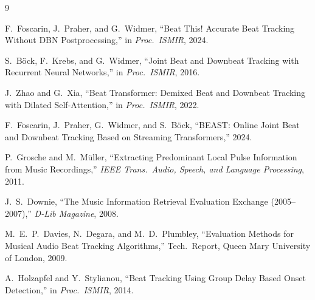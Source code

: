 \documentclass[a4paper]{article}
\begin{document}


\begin{thebibliography}{9}

F.~Foscarin, J.~Praher, and G.~Widmer,
``Beat This! Accurate Beat Tracking Without DBN Postprocessing,''
in \textit{Proc.\ ISMIR}, 2024.

S.~B\"{o}ck, F.~Krebs, and G.~Widmer,
``Joint Beat and Downbeat Tracking with Recurrent Neural Networks,''
in \textit{Proc.\ ISMIR}, 2016.

J.~Zhao and G.~Xia,
``Beat Transformer: Demixed Beat and Downbeat Tracking with Dilated Self-Attention,''
in \textit{Proc.\ ISMIR}, 2022.

F.~Foscarin, J.~Praher, G.~Widmer, and S.~B\"{o}ck,
``BEAST: Online Joint Beat and Downbeat Tracking Based on Streaming Transformers,''
2024.

P.~Grosche and M.~M\"{u}ller,
``Extracting Predominant Local Pulse Information from Music Recordings,''
\textit{IEEE Trans.\ Audio, Speech, and Language Processing}, 2011.

J.~S.~Downie,
``The Music Information Retrieval Evaluation Exchange (2005--2007),''
\textit{D-Lib Magazine}, 2008.

M.~E.~P.~Davies, N.~Degara, and M.~D.~Plumbley,
``Evaluation Methods for Musical Audio Beat Tracking Algorithms,''
Tech.\ Report, Queen Mary University of London, 2009.

A.~Holzapfel and Y.~Stylianou,
``Beat Tracking Using Group Delay Based Onset Detection,''
in \textit{Proc.\ ISMIR}, 2014.

\end{thebibliography}
\end{document}
